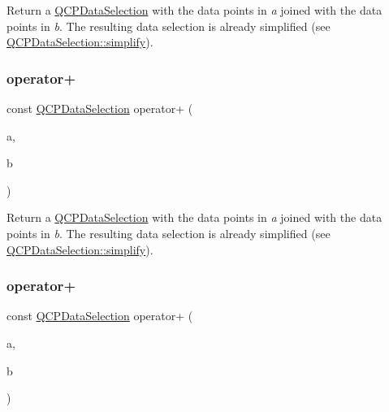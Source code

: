 Return a \mbox{\hyperlink{class_q_c_p_data_selection}{Q\+C\+P\+Data\+Selection}} with the data points in {\itshape a} joined with the data points in {\itshape b}. The resulting data selection is already simplified (see \mbox{\hyperlink{class_q_c_p_data_selection_a4a2fbad1a6e4d1dd26fdfdf88956f2a4}{Q\+C\+P\+Data\+Selection\+::simplify}}). \mbox{\label{class_q_c_p_data_selection_a5feed9419bd3df5cb4d4a761580545cc}} 
\subsubsection{\texorpdfstring{operator+}{operator+}\hspace{0.1cm}{\footnotesize\ttfamily [2/4]}}
{\footnotesize\ttfamily const \mbox{\hyperlink{class_q_c_p_data_selection}{Q\+C\+P\+Data\+Selection}} operator+ (\begin{DoxyParamCaption}\item[{const \mbox{\hyperlink{class_q_c_p_data_range}{Q\+C\+P\+Data\+Range}} \&}]{a,  }\item[{const \mbox{\hyperlink{class_q_c_p_data_selection}{Q\+C\+P\+Data\+Selection}} \&}]{b }\end{DoxyParamCaption})\hspace{0.3cm}{\ttfamily [friend]}}

Return a \mbox{\hyperlink{class_q_c_p_data_selection}{Q\+C\+P\+Data\+Selection}} with the data points in {\itshape a} joined with the data points in {\itshape b}. The resulting data selection is already simplified (see \mbox{\hyperlink{class_q_c_p_data_selection_a4a2fbad1a6e4d1dd26fdfdf88956f2a4}{Q\+C\+P\+Data\+Selection\+::simplify}}). \mbox{\label{class_q_c_p_data_selection_aa574f51a74d6998e9be95e252e6be287}} 
\subsubsection{\texorpdfstring{operator+}{operator+}\hspace{0.1cm}{\footnotesize\ttfamily [3/4]}}
{\footnotesize\ttfamily const \mbox{\hyperlink{class_q_c_p_data_selection}{Q\+C\+P\+Data\+Selection}} operator+ (\begin{DoxyParamCaption}\item[{const \mbox{\hyperlink{class_q_c_p_data_selection}{Q\+C\+P\+Data\+Selection}} \&}]{a,  }\item[{const \mbox{\hyperlink{class_q_c_p_data_range}{Q\+C\+P\+Data\+Range}} \&}]{b }\end{DoxyParamCaption})\hspace{0.3cm}{\ttfamily [friend]}}

